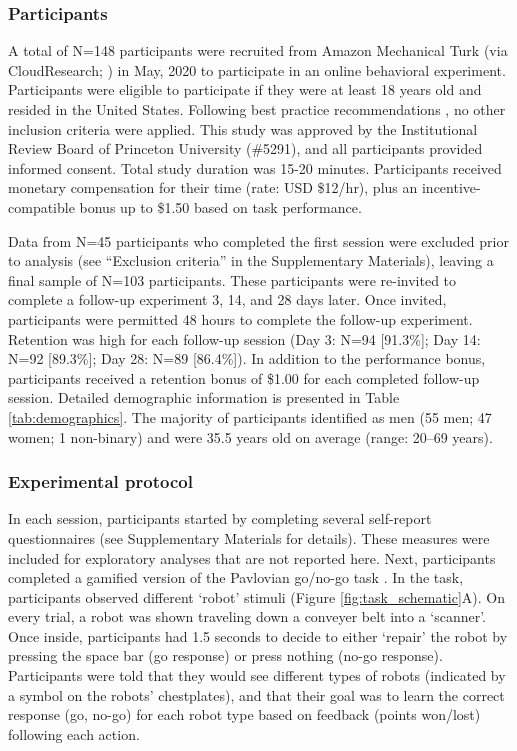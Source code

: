 \documentclass[a4paper,12pt]{article}
\begin{document}
\begin{refsection}[main]
\subsubsection*{Participants}

A total of N=148 participants were recruited from Amazon Mechanical Turk (via CloudResearch; \cite{litman2017turkprime}) in May, 2020 to participate in an online behavioral experiment. Participants were eligible to participate if they were at least 18 years old and resided in the United States. Following best practice recommendations \cite{robinson2019tapped}, no other inclusion criteria were applied. This study was approved by the Institutional Review Board of Princeton University (\#5291), and all participants provided informed consent. Total study duration was 15-20 minutes. Participants received monetary compensation for their time (rate: USD \$12/hr), plus an incentive-compatible bonus up to \$1.50 based on task performance. 

Data from N=45 participants who completed the first session were excluded prior to analysis (see ``Exclusion criteria'' in the Supplementary Materials), leaving a final sample of N=103 participants. These participants were re-invited to complete a follow-up experiment 3, 14, and 28 days later. Once invited, participants were permitted 48 hours to complete the follow-up experiment. Retention was high for each follow-up session (Day 3: N=94 [91.3\%]; Day 14: N=92 [89.3\%]; Day 28: N=89 [86.4\%]). In addition to the performance bonus, participants received a retention bonus of \$1.00 for each completed follow-up session. Detailed demographic information is presented in Table \ref{tab:demographics}. The majority of participants identified as men (55 men; 47 women; 1 non-binary) and were 35.5 years old on average (range: 20--69 years).

\subsubsection*{Experimental protocol}

In each session, participants started by completing several self-report questionnaires (see Supplementary Materials for details). These measures were included for exploratory analyses that are not reported here. Next, participants completed a gamified version of the Pavlovian go/no-go task \cite{guitart2012go, swart2017catecholaminergic}. In the task, participants observed different `robot' stimuli (Figure \ref{fig:task_schematic}A). On every trial, a robot was shown traveling down a conveyer belt into a `scanner'. Once inside, participants had 1.5 seconds to decide to either `repair' the robot by pressing the space bar (go response) or press nothing (no-go response). Participants were told that they would see different types of robots (indicated by a symbol on the robots' chestplates), and that their goal was to learn the correct response (go, no-go) for each robot type based on feedback (points won/lost) following each action.


\end{refsection}
\end{document}
